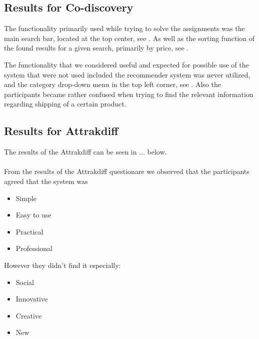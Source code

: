 \subsection{Results for Co-discovery}
The functionality primarily used while trying to solve the assignments was the main search bar, located at the top center, see . As well as the sorting function of the found results for a given search, primarily by price, see .

The functionality that we considered useful and expected for possible use of the system that were not used included the recommender system was never utilized, and the category drop-down menu in the top left corner, see . Also the participants became rather confused when trying to find the relevant information regarding shipping of a certain product.

\subsection{Results for Attrakdiff}
The results of the Attrakdiff can be seen in ... below. \\

 \\

From the results of the Attrakdiff questionare we observed that the participants agreed that the system was
\begin{itemize}
\item Simple
\item Easy to use
\item Practical
\item Professional
\end{itemize}
However they didn't find it especially:
\begin{itemize}
\item Social
\item Innovative
\item Creative
\item New
\end{itemize}
